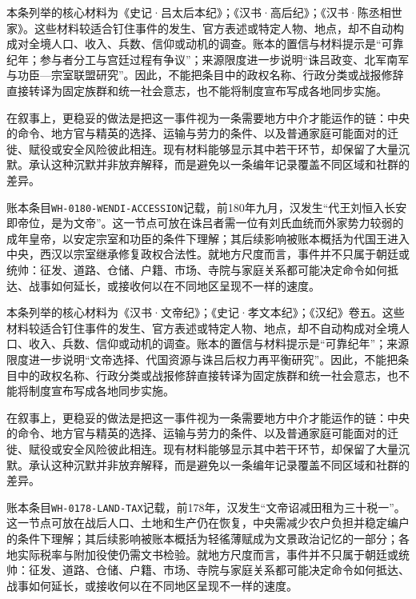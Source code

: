 本条列举的核心材料为《史记·吕太后本纪》；《汉书·高后纪》；《汉书·陈丞相世家》。这些材料较适合钉住事件的发生、官方表述或特定人物、地点，却不自动构成对全境人口、收入、兵数、信仰或动机的调查。账本的置信与材料提示是“可靠纪年；参与者分工与宫廷过程有争议”；来源限度进一步说明“诛吕政变、北军南军与功臣—宗室联盟研究”。因此，不能把条目中的政权名称、行政分类或战报修辞直接转译为固定族群和统一社会意志，也不能将制度宣布写成各地同步实施。

在叙事上，更稳妥的做法是把这一事件视为一条需要地方中介才能运作的链：中央的命令、地方官与精英的选择、运输与劳力的条件、以及普通家庭可能面对的迁徙、赋役或安全风险彼此相连。现有材料能够显示其中若干环节，却保留了大量沉默。承认这种沉默并非放弃解释，而是避免以一条编年记录覆盖不同区域和社群的差异。

账本条目\texttt{WH-0180-WENDI-ACCESSION}记载，前180年九月，汉发生“代王刘恒入长安即帝位，是为文帝”。这一节点可放在诛吕者需一位有刘氏血统而外家势力较弱的成年皇帝，以安定宗室和功臣的条件下理解；其后续影响被账本概括为代国王进入中央，西汉以宗室继承修复政权合法性。就地方尺度而言，事件并不只属于朝廷或统帅：征发、道路、仓储、户籍、市场、寺院与家庭关系都可能决定命令如何抵达、战事如何延长，或接收何以在不同地区呈现不一样的速度。

本条列举的核心材料为《汉书·文帝纪》；《史记·孝文本纪》；《汉纪》卷五。这些材料较适合钉住事件的发生、官方表述或特定人物、地点，却不自动构成对全境人口、收入、兵数、信仰或动机的调查。账本的置信与材料提示是“可靠纪年”；来源限度进一步说明“文帝选择、代国资源与诛吕后权力再平衡研究”。因此，不能把条目中的政权名称、行政分类或战报修辞直接转译为固定族群和统一社会意志，也不能将制度宣布写成各地同步实施。

在叙事上，更稳妥的做法是把这一事件视为一条需要地方中介才能运作的链：中央的命令、地方官与精英的选择、运输与劳力的条件、以及普通家庭可能面对的迁徙、赋役或安全风险彼此相连。现有材料能够显示其中若干环节，却保留了大量沉默。承认这种沉默并非放弃解释，而是避免以一条编年记录覆盖不同区域和社群的差异。

账本条目\texttt{WH-0178-LAND-TAX}记载，前178年，汉发生“文帝诏减田租为三十税一”。这一节点可放在战后人口、土地和生产仍在恢复，中央需减少农户负担并稳定编户的条件下理解；其后续影响被账本概括为轻徭薄赋成为文景政治记忆的一部分；各地实际税率与附加役使仍需文书检验。就地方尺度而言，事件并不只属于朝廷或统帅：征发、道路、仓储、户籍、市场、寺院与家庭关系都可能决定命令如何抵达、战事如何延长，或接收何以在不同地区呈现不一样的速度。

